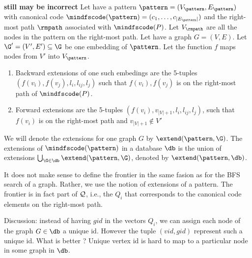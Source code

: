 \begin{definition}
\textbf{still may be incorrect}
Let have a pattern $\pattern = (V_\pattern, E_\pattern)$ with
canonical code $\mindfscode(\pattern) = (c_1, \ldots,
c_{|E_\pattern|})$ and the right-most path $\rmpath$ associated with
$\mindfscode(P)$. Let $V_\rmpath$ are all the nodes in the pattern on
the right-most path. Let have a graph $G=(V,E)$. Let
$\G'=(V',E')\subseteq \G$ be one embedding of $\pattern$. Let
the function $f$ maps nodes from $V'$ into $V_\pattern$.

\begin{enumerate}
\item Backward extensions of one such embedings are the 5-tuples
  $(f(v_i), f(v_j), l_i, l_{ij}, l_j)$ such that $f(v_i), f(v_j)$ is on the
  right-most path of $\mindfscode(P)$.
\item Forward extensions are the 5-tuples $(f(v_i), v_{|V|+1}, l_i,
  l_{ij}, l_j)$, such that $f(v_i)$ is on the right-most path and
  $v_{|V|+1}\not\in V'$
\end{enumerate}

\noindent We will denote the extensions for one graph $G$ by $\extend(\pattern,
\G)$. The extensions of $\mindfscode(\pattern)$ in a database $\db$ is the
union of extensions $\bigcup_{\G\in\db} \extend(\pattern, \G)$,
denoted by $\extend(\pattern, \db)$.



\end{definition}

It does not make sense to define the frontier in the same fasion as
for the BFS search of a graph. Rather, we use the notion of extensions
of a pattern. The frontier is in fact part of ${\cal Q}$, i.e., the
$Q_i$ that corresponds to the canonical code elements on the
right-most path.

Discussion: instead of having $gid$ in the vectors $Q_i$, we can
assign each node of the graph $G\in \db$ a unique id. However the
tuple $(vid,gid)$ represent such a unique id. What is better ? Unique
vertex id is hard to map to a particular node in some graph in $\db$.


